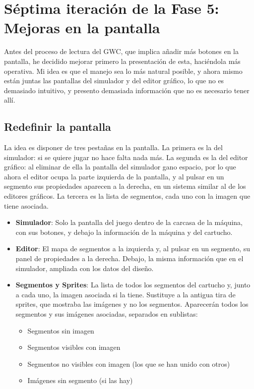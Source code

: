 \section{Séptima iteración de la Fase 5: Mejoras en la pantalla}
\label{sec:F5I7}

Antes del proceso de lectura del GWC, que implica añadir más botones en
la pantalla, he decidido mejorar primero la presentación de esta, haciéndola
más operativa. Mi idea es que el manejo sea lo más natural posible, y
ahora mismo están juntas las pantallas del simulador y del editor
gráfico, lo que no es demasiado intuitivo, y presento demasiada información
que no es necesario tener allí.

\subsection{Redefinir la pantalla}
\label{sec:F5I7Pantalla}

La idea es disponer de tres pestañas en la pantalla. La primera es la
del simulador: si se quiere jugar no hace falta nada más. La segunda es
la del editor gráfico: al eliminar de ella la pantalla del simulador
gano espacio, por lo que ahora el editor ocupa la parte izquierda de la
pantalla, y al pulsar en un segmento sus propiedades aparecen a la
derecha, en un sistema similar al de los editores gráficos. La tercera
es la lista de segmentos, cada uno con la imagen que tiene asociada.

\begin{itemize}
	\item \textbf{Simulador}: 
	Solo la pantalla del juego dentro de la carcasa de la máquina, con
	sus botones, y debajo la información de la máquina y del cartucho.
	
	\item \textbf{Editor}:
	El mapa de segmentos a la izquierda y, al pulsar en un segmento, su
	panel de propiedades a la derecha. Debajo, la misma información que
	en el simulador, ampliada con los datos del diseño.
	
	\item \textbf{Segmentos y Sprites}:
	La lista de todos los segmentos del cartucho y, junto a cada uno, la
	imagen asociada si la tiene. Sustituye a la antigua tira de sprites,
	que mostraba las imágenes y no los segmentos. Aparecerán todos los segmentos y sus imágenes asociadas, separados en sublistas:
	\begin{itemize}
		\item Segmentos sin imagen
		\item Segmentos visibles con imagen
		\item Segmentos no visibles con imagen (los que se han unido con otros)
		\item Imágenes sin segmento (si las hay)
	\end{itemize}
\end{itemize}

